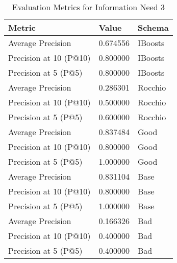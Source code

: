 \begingroup
    \renewcommand{\arraystretch}{2} %
    \begin{table}[!h]
        \centering
        \begin{tabular}{l | l | l}
            Metric & Value & Schema \\
            \hline
            Average Precision & 0.674556 & IBoosts \\
            Precision at 10 (P@10) & 0.800000 & IBoosts \\
            Precision at 5 (P@5) & 0.800000 & IBoosts \\
            \hline
            Average Precision & 0.286301 & Rocchio \\
            Precision at 10 (P@10) & 0.500000 & Rocchio \\
            Precision at 5 (P@5) & 0.600000 & Rocchio \\
            \hline
            Average Precision & 0.837484 & Good \\
            Precision at 10 (P@10) & 0.800000 & Good\\
            Precision at 5 (P@5) & 1.000000 & Good\\
            \hline
            Average Precision & 0.831104 & Base \\
            Precision at 10 (P@10) & 0.800000 & Base\\
            Precision at 5 (P@5) & 1.000000 & Base\\
            \hline
            Average Precision & 0.166326 & Bad\\
            Precision at 10 (P@10) & 0.400000 & Bad\\
            Precision at 5 (P@5) & 0.400000 & Bad\\
        \end{tabular}
        \caption{Evaluation Metrics for Information Need 3}
        \label{tab:metrics-info-3-2}
    \end{table}
\endgroup

